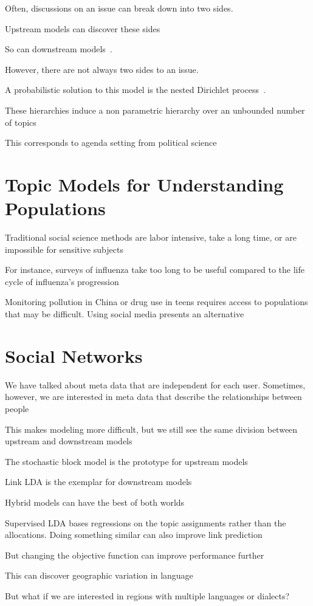 Often, discussions on an issue can break down into two sides.

Upstream models can discover these sides~\citep{paul-10}

So can downstream models~\citep{nguyen-13:shlda}.

However, there are not always two sides to an issue.

A probabilistic solution to this model is the nested Dirichlet
process~\citep{blei-07}.

These hierarchies induce a non parametric hierarchy over an unbounded
number of topics

This corresponds to agenda setting from political science~\citep{Nguyen:Boyd-Graber:Resnik:Miler-2015}

\section{Topic Models for Understanding Populations}

Traditional social science methods are labor intensive, take a long
time, or are impossible for sensitive subjects

For instance, surveys of influenza take too long to be useful compared
to the life cycle of influenza's progression~\cite{broniatowsky-15}

Monitoring pollution in China or drug use in teens requires access to
populations that may be difficult.  Using social media presents an
alternative~\cite{wang:paul:dredze-15}

\section{Social Networks}

We have talked about meta data that are independent for each user.
Sometimes, however, we are interested in meta data that describe the
relationships between people

This makes modeling more difficult, but we still see the same division
between upstream and downstream models

The stochastic block model is the prototype for upstream models~\cite{airoldi-08}

Link LDA is the exemplar for downstream models~\cite{nallapati-08}

Hybrid models can have the best of both worlds

Supervised LDA bases regressions on the topic assignments rather than
the allocations.  Doing something similar can also improve link prediction~\citep{chang-09a}

But changing the objective function can improve performance further~\cite{bach-15}

This can discover geographic variation in language~\cite{eisenstein-10}

But what if we are interested in regions with multiple languages or
dialects?
